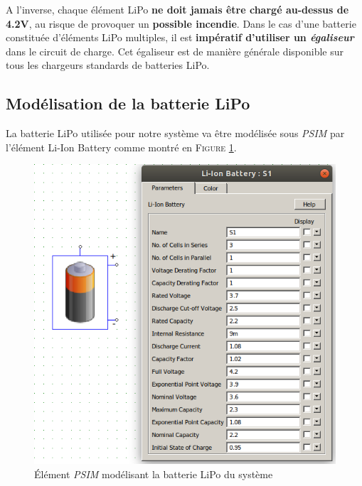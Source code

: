 		A l'inverse, chaque élément LiPo 
		\textbf{ne doit jamais être chargé au-dessus de 4.2V}, au risque de 
		provoquer un \textbf{possible incendie}. Dans le cas d'une batterie 
		constituée d'éléments LiPo multiples, il est 
		\textbf{impératif d'utiliser un \textit{égaliseur}} dans le circuit 
		de charge. Cet égaliseur est de manière générale disponible sur tous
		les chargeurs standards de batteries LiPo.
		
			
		\subsection{Modélisation de la batterie LiPo}
			
		La batterie LiPo utilisée pour notre système va être modélisée sous 
		\textit{PSIM} par l'élément Li-Ion Battery comme montré en 
		\textsc{Figure \ref{lipo_model_psim}}.
			
		\begin{figure}[h]
			\begin{center}
				\includegraphics[scale=0.5]{../Illus/lipo_model_psim.png}
			\end{center}
			\caption{Élément \textit{PSIM} modélisant la batterie LiPo du 
			système}
			\label{lipo_model_psim}
		\end{figure}
			
